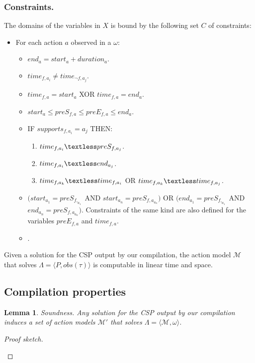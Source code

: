 \documentclass[letterpaper]{article} %
\newcommand{\tup}[1]{{\langle #1 \rangle}}
\newtheorem{lemma}[theorem]{Lemma}
\begin{document}
\subsubsection{Constraints.} The domains of the variables in $X$ is bound by the following set $C$ of constraints:
\begin{itemize}
\item For each action $a$ observed in a $\omega$:
\begin{itemize}
\item $end_a = start_a + duration_a$.
\item $time_{f,a_i}\neq time_{\neg f,a_j}$.
\item $time_{f,a}= start_a$ XOR $time_{f,a}= end_a$.
\item $start_a\leq preS_{f,a}\leq preE_{f,a}\leq end_a$.
\item IF $supports_{f,a_i}=a_j$ THEN:
\begin{enumerate}
\item $time_{f,a_i}\textless  preS_{f,a_j}$.
\item $time_{f,a_i}\textless  end_{a_j}$.
\item $time_{f,a_k}\textless time_{f,a_i}$ OR $time_{f,a_k}\textless time_{f,a_j}$.
\end{enumerate}
\item $(start_{a_1} = preS_{f,_{a_1}}$ AND $start_{a_n} = preS_{f,a_{a_n}})$ OR $(end_{a_1} = preS_{f,_{a_1}}$ AND $end_{a_n} = preS_{f,a_{a_n}})$. Constraints of the same kind are also defined for the variables $preE_{f,a}$ and $time_{f,a}$.
\item .
\end{itemize}
\end{itemize}

Given a solution for the CSP output by our compilation, the action model $\mathcal{M}$ that solves $\Lambda=\tup{P,obs(\tau)}$ is computable in linear time and space. 


\subsection{Compilation properties}
\begin{lemma}
Soundness. Any solution for the CSP output by our compilation induces a set of action models $\mathcal{M}'$ that solves $\Lambda=\tup{\mathcal{M},\omega}$.
\end{lemma}

\begin{proof}[Proof sketch]
\begin{small}
\end{small}
\end{proof}
\end{document}
